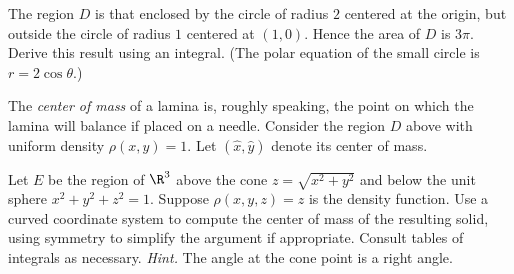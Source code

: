\documentclass[12pt]{exam}
\theoremstyle{definition}
\begin{document}
\begin{questions}

\question The region $D$ is that enclosed by the circle of radius $2$ centered at the origin, but outside the circle of radius $1$ centered at $(1,0)$. Hence the area of $D$ is $3\pi$. Derive this result using an integral. (The polar equation of the small circle is $r = 2\cos\theta$.)


\question The \emph{center of mass} of a lamina is, roughly speaking, the point on which the lamina will balance if placed on a needle. Consider the region $D$ above with uniform density $\rho(x,y) = 1$. Let $(\hat{x}, \hat{y})$ denote its center of mass.


\newpage

\question Let $E$ be the region of $\R^3$ above the cone $z = \sqrt{x^2 + y^2}$ and below the unit sphere $x^2 + y^2 + z^2 = 1$. Suppose $\rho(x,y,z) = z$ is the density function. Use a curved coordinate system to compute the center of mass of the resulting solid, using symmetry to simplify the argument if appropriate. Consult tables of integrals as necessary. \emph{Hint.} The angle at the cone point is a right angle.


\end{questions} 
\end{document}
